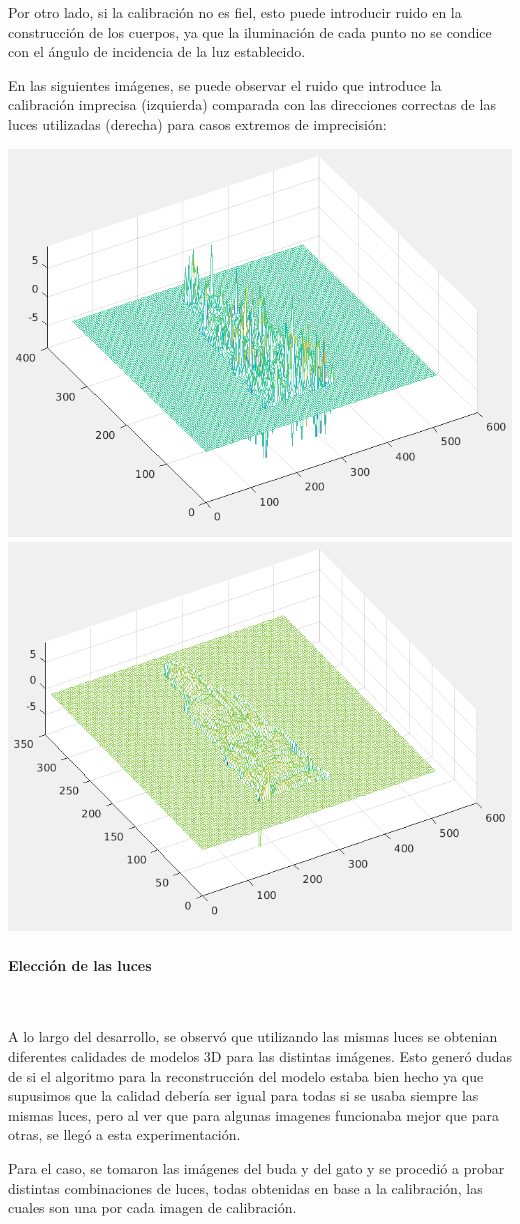 Por otro lado, si la calibración no es fiel, esto puede introducir ruido en
la construcción de los cuerpos, ya que la iluminación de cada punto no
se condice con el ángulo de incidencia de la luz establecido.

En las siguientes imágenes, se puede observar el ruido que introduce la calibración
imprecisa (izquierda) comparada con las direcciones correctas de las luces utilizadas
(derecha) para casos extremos de imprecisión:

\begin{center}
\includegraphics[width=.4\linewidth]{imagenes/calib-ruido.png}
\includegraphics[width=.4\linewidth]{imagenes/luces-limpio.png}
\end{center}

\paragraph{Elección de las luces}
\

A lo largo del desarrollo, se observó que utilizando las mismas luces se obtenian diferentes calidades de modelos 3D para las distintas imágenes. Esto generó dudas de si el algoritmo para la reconstrucción del modelo estaba bien hecho ya que supusimos que la calidad debería ser igual para todas si se usaba siempre las mismas luces, pero al ver que para algunas imagenes funcionaba mejor que para otras, se llegó a esta experimentación.

Para el caso, se tomaron las imágenes del buda y del gato y se procedió a probar distintas combinaciones de luces, todas obtenidas en base a la calibración, las cuales son una por cada imagen de calibración.

